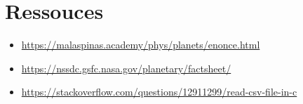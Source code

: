 \documentclass[a4paper,10pt]{article}
\begin{document}
    \section{Ressouces}\label{sec:ressouces}
    \begin{itemize}
        \item \href{https://malaspinas.academy/phys/planets/enonce.html}{https://malaspinas.academy/phys/planets/enonce.html}
        \item \href{https://nssdc.gsfc.nasa.gov/planetary/factsheet/}{https://nssdc.gsfc.nasa.gov/planetary/factsheet/}
        \item \href{https://stackoverflow.com/questions/12911299/read-csv-file-in-c}{https://stackoverflow.com/questions/12911299/read-csv-file-in-c}
    \end{itemize}
\end{document}
